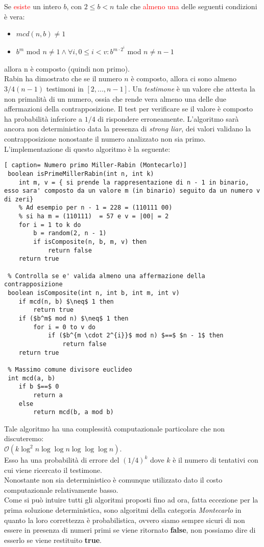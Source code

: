 \documentclass[../cheatSheetAlgoritmi.tex]{subfiles}
\begin{document}
Se \textcolor{red}{esiste} un intero $b$, con $2 \leq b < n$ tale che \textcolor{red}{almeno una} delle seguenti condizioni è vera:
\begin{itemize}
	\item $mcd(n,b) \neq 1$
	\item $b^{m}$ mod  $n \neq 1 \land \forall i, 0 \leq i < v : b^{m \cdot 2^i}$ mod $n \neq n - 1$  
\end{itemize}
allora n è composto (quindi non primo). \\
Rabin ha dimostrato che se il numero $n$ è composto, allora ci sono almeno $3/4 (n - 1)$ testimoni in $[2, ..., n - 1]$. Un \emph{testimone} è un valore che attesta la non primalità di un numero, ossia che rende vera almeno una delle due affermazioni della contrapposizione. Il test per verificare se il valore è composto ha probabilità inferiore a $1/4$ di rispondere erroneamente. L'algoritmo sarà ancora non deterministico data la presenza di \emph{strong liar}, dei valori validano la contrapposizione nonostante il numero analizzato non sia primo. \\
L'implementazione di questo algoritmo è la seguente:
\newpage
 \begin{lstlisting}[ caption= Numero primo Miller-Rabin (Montecarlo)]
 boolean isPrimeMillerRabin(int n, int k)
 	int m, v = { si prende la rappresentazione di n - 1 in binario, esso sara' composto da un valore m (in binario) seguito da un numero v di zeri}
 	% Ad esempio per n - 1 = 228 = (110111 00) 
 	% si ha m = (110111)  = 57 e v = |00| = 2
 	for i = 1 to k do
 		b = random(2, n - 1)
 		if isComposite(n, b, m, v) then
 			return false
 	return true
 
 % Controlla se e' valida almeno una affermazione della contrapposizione
 boolean isComposite(int n, int b, int m, int v)
 	if mcd(n, b) $\neq$ 1 then
 		return true
 	if ($b^m$ mod n) $\neq$ 1 then
 		for i = 0 to v do
 			if ($b^{m \cdot 2^{i}}$ mod n) $==$ $n - 1$ then	
 				return false
 	return true
 	
 % Massimo comune divisore euclideo
 int mcd(a, b)
    if b $==$ 0
        return a
    else
        return mcd(b, a mod b)
\end{lstlisting}
Tale algoritmo ha una complessità computazionale particolare che non discuteremo: \\
 $\mathcal{O}(k \log^2 n \log \log n \log \log \log n)$. \\
 Esso ha una probabilità di errore del $(1/4)^k$ dove $k$ è il numero di tentativi con cui viene ricercato il testimone. \\
 Nonostante non sia deterministico è comunque utilizzato dato il costo computazionale relativamente basso. \\
Come si può intuire tutti gli algoritmi proposti fino ad ora, fatta eccezione per la prima soluzione deterministica, sono algoritmi della categoria \emph{Montecarlo} in quanto la loro correttezza è probabilistica, ovvero siamo sempre sicuri di non essere in presenza di numeri primi se viene ritornato \textbf{false}, non possiamo dire di esserlo se viene restituito \textbf{true}.
\end{document}
